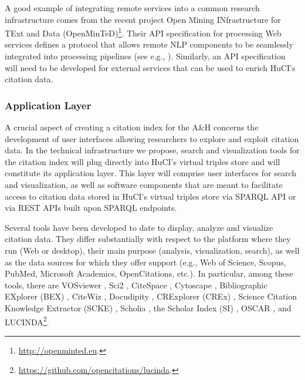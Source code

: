 A good example of integrating remote services into a common research infrastructure comes from the recent project Open Mining INfrastructure for TExt and Data (OpenMinTeD)\footnote{\url{http://openminted.eu}.}. Their API specification for processing Web services defines a protocol that allows remote NLP components to be seamlessly integrated into processing pipelines (see e.g., \cite{ba_interoperability_2016}). Similarly, an API specification will need to be developed for external services that can be used to enrich HuCI's citation data. 

\subsubsection{Application Layer}

A crucial aspect of creating a citation index for the A\&H concerns the development of user interfaces allowing researchers to explore and exploit citation data. In the technical infrastructure we propose, search and visualization tools for the citation index will plug directly into HuCI’s virtual triples store and will constitute its application layer. 
This layer will comprise user interfaces for search and visualization, as well as software components that are meant to facilitate access to citation data stored in HuCI's virtual triples store via SPARQL API or via REST APIs built upon SPARQL endpoints. 

Several tools have been developed to date to display, analyze and visualize citation data. They differ substantially with respect to the platform where they run (Web or desktop), their main purpose (analysis, visualization, search), as well as the data sources for which they offer support (e.g., Web of Science, Scopus, PubMed, Microsoft Academics, OpenCitations, etc.). In particular, among these tools, there are VOSviewer \cite{van_eck_software_2010}, Sci2 \cite{sci2_team_sci2_2009}, CiteSpace \cite{chen_searching_2004}, Cytoscape \cite{shannon_cytoscape:_2003}, Bibliographic EXplorer (BEX) \cite{di_iorio_exploring_2015}, CiteWiz \cite{elmqvist_citewiz_2007}, Docudipity \cite{poggi_exploiting_2019}, CRExplorer (CREx) \cite{thor_introducing_2016}, Science Citation Knowledge Extractor (SCKE) \cite{lent_science_2018}, Scholia \cite{nielsen_scholia_2017}, the Scholar Index (SI) \cite{colavizza_linked_2018}, OSCAR \cite{heibi_enabling_2019}, and LUCINDA\footnote{\url{https://github.com/opencitations/lucinda}.}.
  

